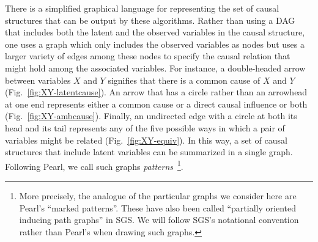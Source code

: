 \documentclass[letterpaper,onecolumn,nofootinbib]{revtex4}
\begin{document}
There is a simplified graphical language for representing the set of causal structures that can be output by these algorithms.  Rather than using a DAG that includes both the latent and the observed variables in the causal structure, one uses a graph which only includes the observed variables as nodes but uses a larger variety of edges among these nodes to specify the causal relation that might hold among the associated variables.
For instance, a double-headed arrow between variables $X$ and $Y$ signifies that there is a common cause of $X$ and $Y$ (Fig.~\ref{fig:XY-latentcause}). An
arrow that has a circle rather than an arrowhead at one end represents either a common cause or a direct causal influence or both (Fig.~\ref{fig:XY-ambcause}).
Finally, an undirected edge with a circle at both its head and its tail represents any of the five possible ways in which a pair of variables might be related (Fig.~\ref{fig:XY-equiv}).  In this way, a set of causal structures that include latent variables can be summarized in a single graph.  Following Pearl, we call such graphs \emph{patterns}~\footnote{More precisely, the analogue of the particular graphs we consider here are Pearl's ``marked patterns''. These have also been called ``partially oriented inducing path graphs'' in SGS.  We will follow SGS's notational convention rather than Pearl's when drawing such graphs.}.
\end{document}
